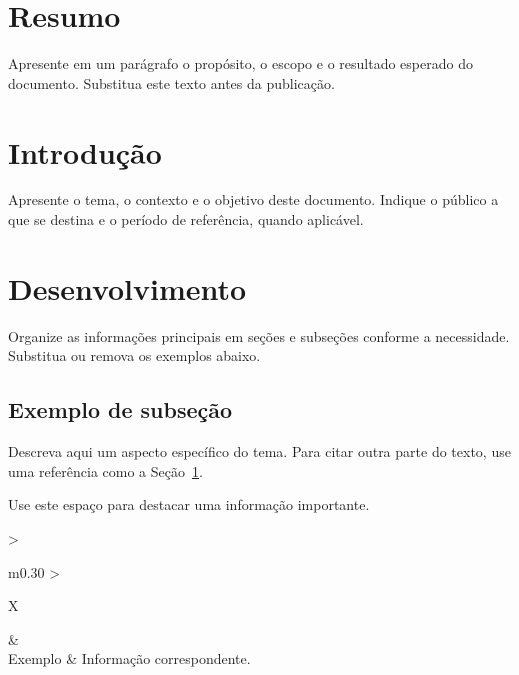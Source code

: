 \documentclass[
  paper-size=a4,
  font-size=11pt,
  two-sided=true,
  title-page=true,
  section-numbering=plain,
  inner-margin=22mm,
  outer-margin=22mm,
  top-margin=24mm,
  bottom-margin=28mm,
  binding-offset=0mm,
  color-model=rgb
]{ieeeufgcs}
\begin{document}
\maketitle

\section*{Resumo}

Apresente em um parágrafo o propósito, o escopo e o resultado esperado do
documento. Substitua este texto antes da publicação.

\clearpage
\tableofcontents
\clearpage

\section{Introdução}\label{sec:introducao}

Apresente o tema, o contexto e o objetivo deste documento. Indique o público
a que se destina e o período de referência, quando aplicável.

\section{Desenvolvimento}

Organize as informações principais em seções e subseções conforme a
necessidade. Substitua ou remova os exemplos abaixo.

\subsection{Exemplo de subseção}

Descreva aqui um aspecto específico do tema. Para citar outra parte do texto,
use uma referência como a Seção~\ref{sec:introducao}.

\begin{IEEECSNotice}[Nota]
Use este espaço para destacar uma informação importante.
\end{IEEECSNotice}

\begin{IEEECSBrandedTable}{
  >{\raggedright\arraybackslash}m{0.30\linewidth}
  >{\raggedright\arraybackslash}X
}
 &  \\
Exemplo & Informação correspondente. \\
\end{IEEECSBrandedTable}
\end{document}
